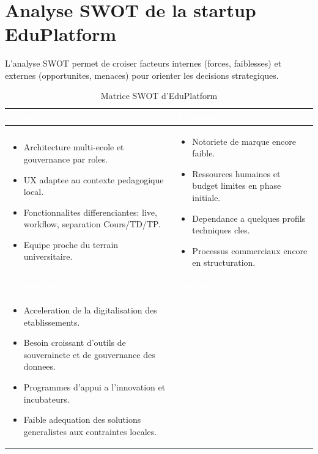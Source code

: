﻿﻿\documentclass[12pt,a4paper,oneside]{report}
\begin{document}
\section{Analyse SWOT de la startup EduPlatform}

L'analyse SWOT permet de croiser facteurs internes (forces, faiblesses) et externes (opportunites, menaces) pour orienter les decisions strategiques.

\renewcommand{\arraystretch}{1.45}
\begin{table}[H]
\centering
\caption{Matrice SWOT d'EduPlatform}
\label{tab:swot_edconnect}
\begin{tabular}{|p{6.2cm}|p{6.2cm}|}
\hline
\rowcolor{ustoblue}
\textcolor{white}{\textbf{Forces (S)}} & \textcolor{white}{\textbf{Faiblesses (W)}} \\
\hline
\begin{itemize}
  \item Architecture multi-ecole et gouvernance par roles.
  \item UX adaptee au contexte pedagogique local.
  \item Fonctionnalites differenciantes: live, workflow, separation Cours/TD/TP.
  \item Equipe proche du terrain universitaire.
\end{itemize}
&
\begin{itemize}
  \item Notoriete de marque encore faible.
  \item Ressources humaines et budget limites en phase initiale.
  \item Dependance a quelques profils techniques cles.
  \item Processus commerciaux encore en structuration.
\end{itemize}
\\
\hline
\rowcolor{ustoblue}
\textcolor{white}{\textbf{Opportunites (O)}} & \textcolor{white}{\textbf{Menaces (T)}} \\
\hline
\begin{itemize}
  \item Acceleration de la digitalisation des etablissements.
  \item Besoin croissant d'outils de souverainete et de gouvernance des donnees.
  \item Programmes d'appui a l'innovation et incubateurs.
  \item Faible adequation des solutions generalistes aux contraintes locales.

\end{itemize}
\end{tabular}
\end{table}
\end{document}
